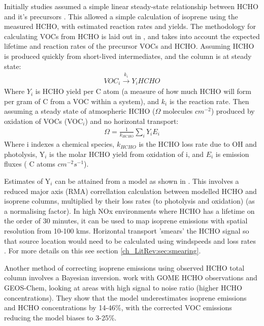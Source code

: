 	    Initially studies assumed a simple linear steady-state relationship between HCHO and it's precursors \citep{Palmer2003, Palmer2006, Millet2006}.
	    This allowed a simple calculation of isoprene using the measured HCHO, with estimated reaction rates and yields.
	    The methodology for calculating VOCs from HCHO is laid out in \citet{Palmer2003}, and takes into account the expected lifetime and reaction rates of the precursor VOCs and HCHO.
	    Assuming HCHO is produced quickly from short-lived intermediates, and the column is at steady state:
	    \begin{eqnarray*}
	    VOC_i \overset{k_i}{\rightarrow} Y_i HCHO
	    \end{eqnarray*}
	    Where $Y_i$ is HCHO yield per C atom (a measure of how much HCHO will form per gram of C from a VOC within a system), and $k_i$ is the reaction rate.
	    Then assuming a steady state of atmospheric HCHO ($\Omega$ molecules $cm^{-2}$) produced by oxidation of VOCs (VOC$_i$) and no horizontal transport:
	    \begin{eqnarray*}
	    \Omega = \frac{1}{k_{HCHO}} \sum_{i} Y_i E_i
	    \end{eqnarray*}
	    Where i indexes a chemical species, $k_{HCHO}$ is the HCHO loss rate due to OH and photolysis, Y$_i$ is the molar HCHO yield from oxidation of i, and $E_i$ is emission fluxes ( C atoms $cm^{-2}s^{-1}$).
	    
	    Estimates of Y$_i$ can be attained from a model as shown in \citet{Millet2006}.
	    This involves a reduced major axis (RMA) correllation calculation between modelled HCHO and isoprene columns, multiplied by their loss rates (to photolysis and oxidation) (as a normalising factor).  
	    In high NOx environments where HCHO has a lifetime on the order of 30 minutes, it can be used to map isoprene emissions with spatial resolution from 10-100 kms.
	    Horizontal transport 'smears' the HCHO signal so that source location would need to be calculated using windspeeds and loss rates \citep{Palmer2001,Palmer2003}.
	    For more details on this see section \ref{ch_LitRev:sec:smearing}.
	    
	    Another method of correcting isoprene emissions using observed HCHO total column involves a Bayesian inversion.
	    \citet{Shim2005} work with GOME HCHO observations and GEOS-Chem, looking at areas with high signal to noise ratio (higher HCHO concentrations).
	    They show that the model underestimates isoprene emissions and HCHO concentrations by 14-46\%, with the corrected VOC emissions reducing the model biases to 3-25\%.
	    
